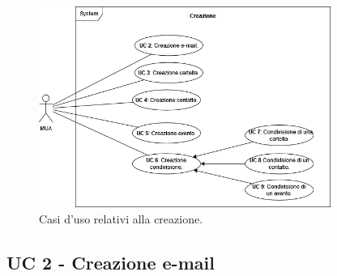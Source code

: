 

\begin{figure}[H]
    \includegraphics[width=0.85\textwidth]{sections/uc_imgs/UC-creazione.png}
    \centering
    \caption{Casi d'uso relativi alla creazione.}
\end{figure}

\subsection{UC 2 - Creazione e-mail} \label{sec:UC2}

